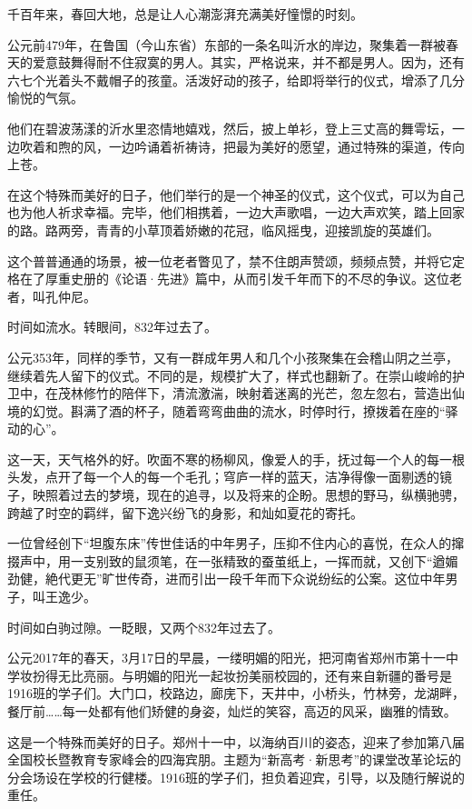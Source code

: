 \documentclass[openany]{ctexbook}
\begin{document}
千百年来，春回大地，总是让人心潮澎湃充满美好憧憬的时刻。

公元前479年，在鲁国（今山东省）东部的一条名叫沂水的岸边，聚集着一群被春天的爱意鼓舞得耐不住寂寞的男人。其实，严格说来，并不都是男人。因为，还有六七个光着头不戴帽子的孩童。活泼好动的孩子，给即将举行的仪式，增添了几分愉悦的气氛。

他们在碧波荡漾的沂水里恣情地嬉戏，然后，披上单衫，登上三丈高的舞雩坛，一边吹着和煦的风，一边吟诵着祈祷诗，把最为美好的愿望，通过特殊的渠道，传向上苍。

在这个特殊而美好的日子，他们举行的是一个神圣的仪式，这个仪式，可以为自己也为他人祈求幸福。完毕，他们相携着，一边大声歌唱，一边大声欢笑，踏上回家的路。路两旁，青青的小草顶着娇嫩的花冠，临风摇曳，迎接凯旋的英雄们。

这个普普通通的场景，被一位老者瞥见了，禁不住朗声赞颂，频频点赞，并将它定格在了厚重史册的《论语·先进》篇中，从而引发千年而下的不尽的争议。这位老者，叫孔仲尼。

时间如流水。转眼间，832年过去了。

公元353年，同样的季节，又有一群成年男人和几个小孩聚集在会稽山阴之兰亭，继续着先人留下的仪式。不同的是，规模扩大了，样式也翻新了。在崇山峻岭的护卫中，在茂林修竹的陪伴下，清流激湍，映射着迷离的光芒，忽左忽右，营造出仙境的幻觉。斟满了酒的杯子，随着弯弯曲曲的流水，时停时行，撩拨着在座的``驿动的心''。

这一天，天气格外的好。吹面不寒的杨柳风，像爱人的手，抚过每一个人的每一根头发，点开了每一个人的每一个毛孔；穹庐一样的蓝天，洁净得像一面剔透的镜子，映照着过去的梦境，现在的追寻，以及将来的企盼。思想的野马，纵横驰骋，跨越了时空的羁绊，留下逸兴纷飞的身影，和灿如夏花的寄托。

一位曾经创下``坦腹东床''传世佳话的中年男子，压抑不住内心的喜悦，在众人的撺掇声中，用一支别致的鼠须笔，在一张精致的蚕茧纸上，一挥而就，又创下``遒媚劲健，絶代更无''旷世传奇，进而引出一段千年而下众说纷纭的公案。这位中年男子，叫王逸少。

时间如白驹过隙。一眨眼，又两个832年过去了。

公元2017年的春天，3月17日的早晨，一缕明媚的阳光，把河南省郑州市第十一中学妆扮得无比亮丽。与明媚的阳光一起妆扮美丽校园的，还有来自新疆的番号是1916班的学子们。大门口，校路边，廊庑下，天井中，小桥头，竹林旁，龙湖畔，餐厅前\ldots{}\ldots{}每一处都有他们矫健的身姿，灿烂的笑容，高迈的风采，幽雅的情致。

这是一个特殊而美好的日子。郑州十一中，以海纳百川的姿态，迎来了参加第八届全国校长暨教育专家峰会的四海宾朋。主题为``新高考·新思考''的课堂改革论坛的分会场设在学校的行健楼。1916班的学子们，担负着迎宾，引导，以及随行解说的重任。
\end{document}
